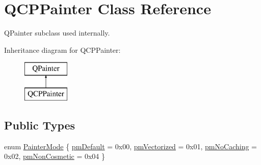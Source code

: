 \hypertarget{classQCPPainter}{}\section{Q\+C\+P\+Painter Class Reference}
\label{classQCPPainter}


Q\+Painter subclass used internally.  


Inheritance diagram for Q\+C\+P\+Painter\+:\begin{figure}[H]
\begin{center}
\leavevmode
\includegraphics[height=2.000000cm]{classQCPPainter}
\end{center}
\end{figure}
\subsection*{Public Types}
\begin{DoxyCompactItemize}
\item 
enum \hyperlink{classQCPPainter_a156cf16444ff5e0d81a73c615fdb156d}{Painter\+Mode} \{ \hyperlink{classQCPPainter_a156cf16444ff5e0d81a73c615fdb156da3bac5e87e3d58553b297befb4eee2a45}{pm\+Default} = 0x00, 
\hyperlink{classQCPPainter_a156cf16444ff5e0d81a73c615fdb156daeda679cd55dcd468341d07d48a30b6ab}{pm\+Vectorized} = 0x01, 
\hyperlink{classQCPPainter_a156cf16444ff5e0d81a73c615fdb156dae78f9a4eb277a5f9207f50850a51a0b0}{pm\+No\+Caching} = 0x02, 
\hyperlink{classQCPPainter_a156cf16444ff5e0d81a73c615fdb156dac1e481bfaf408f2bd2eaad3ec341f36b}{pm\+Non\+Cosmetic} = 0x04
 \}
\end{DoxyCompactItemize}
